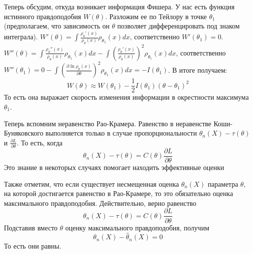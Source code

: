 \begin{remark}
Теперь обсудим, откуда возникает информация Фишера. У нас есть функция истинного правдоподобия $W\left(\theta\right)$. Разложим ее по Тейлору в точке $\theta_1$ (предполагаем, что зависимость он $\theta$ позволяет дифференцировать под знаком интеграла). $W'\left(\theta\right) = \int \frac{\rho_\theta'\left(x\right)}{\rho_\theta\left(x\right)} \rho_{\theta_1}\left(x\right) dx$, соответственно $W'\left(\theta_1\right) = 0$. $W''\left(\theta\right) = \int \frac{\rho_\theta''\left(x\right)}{\rho_\theta\left(x\right)} \rho_{\theta_1}\left(x\right) dx - \int \left(\frac{\rho_\theta'\left(x\right)}{\rho_\theta\left(x\right)}\right) ^ 2 \rho_{\theta_1}\left(x\right) dx$, соответственно $W''\left(\theta_1\right) = 0 - \int \left(\frac{\partial \ln \rho_\theta\left(x\right)}{\partial \theta}\right) ^ 2 \rho_{\theta_1}\left(x\right) dx = -I\left(\theta_1\right)$. В итоге получаем: \[
    W\left(\theta\right) \approx W\left(\theta_1\right) - \frac 1 2 I\left(\theta_1\right) \left(\theta - \theta_1\right) ^ 2
\]
То есть она выражает скорость изменения информации в окрестности максимума $\theta_1$.

\end{remark}
\begin{remark}
Теперь вспомним неравенство Рао-Крамера. Равенство в неравенстве Коши-Буняковского выполняется только в случае пропорциональности $\theta_n\left(X\right) - \tau\left(\theta\right)$ и $\frac{\partial L}{\partial \theta}$. То есть, когда 
\[
    \theta_n\left(X\right) - \tau\left(\theta\right) = C\left(\theta\right)\frac{\partial L}{\partial \theta}
\]
Это знание в некоторых случаях помогает находить эффективные оценки
\end{remark}
\begin{remark}
Также отметим, что если существует несмещенная оценка $\theta_n\left(X\right)$ параметра $\theta$, на которой достигается равенство в Рао-Крамере, то это обязательно оценка максимального правдоподобия. Действительно, верно равенство 
\[
    \theta_n\left(X\right) - \tau\left(\theta\right) = C\left(\theta\right)\frac{\partial L}{\partial \theta}
\]
Подставив вместо $\theta$ оценку максимального правдоподобия, получим
\[
    \theta_n\left(X\right) - \widehat{\theta}_n\left(X\right) = 0
\]
То есть они равны.
\end{remark}
